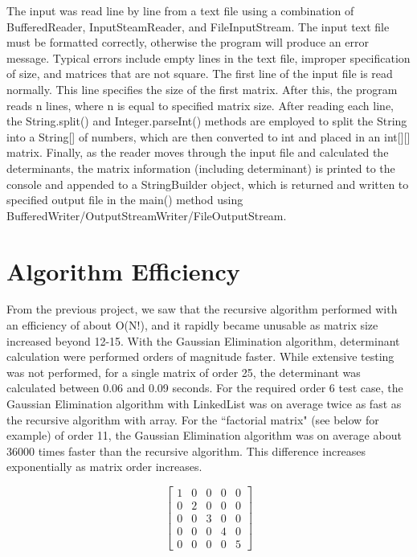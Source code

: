 \documentclass[12pt, titlepage]{article}
\begin{document}
The input was read line by line from a text file using a combination of BufferedReader, InputSteamReader, and FileInputStream. The input text file must be formatted correctly, otherwise the program will produce an error message. Typical errors include empty lines in the text file, improper specification of size, and matrices that are not square. The first line of the input file is read normally. This line specifies the size of the first matrix. After this, the program reads n lines, where n is equal to specified matrix size. After reading each line, the String.split() and Integer.parseInt() methods are employed to split the String into a String[] of numbers, which are then converted to int and placed in an int[][] matrix. Finally, as the reader moves through the input file and calculated the determinants, the matrix information (including determinant) is printed to the console and appended to a StringBuilder object, which is returned and written to specified output file in the main() method using BufferedWriter/OutputStreamWriter/FileOutputStream.





\section{Algorithm Efficiency}

From the previous project, we saw that the recursive algorithm performed with an efficiency of about O(N!), and it rapidly became unusable as matrix size increased beyond 12-15. With the Gaussian Elimination algorithm, determinant calculation were performed orders of magnitude faster. While extensive testing was not performed, for a single matrix of order 25, the determinant was calculated between 0.06 and 0.09 seconds. For the required order 6 test case, the Gaussian Elimination algorithm with LinkedList was on average twice as fast as the recursive algorithm with array. For the ``factorial matrix" (see below for example) of order 11, the Gaussian Elimination algorithm was on average about 36000 times faster than the recursive algorithm. This difference increases exponentially as matrix order increases.

\[
\begin{bmatrix}
	1 & 0 & 0 & 0 & 0 \\
	0 & 2 & 0 & 0 & 0 \\
	0 & 0 & 3 & 0 & 0 \\
	0 & 0 & 0 & 4 & 0 \\
	0 & 0 & 0 & 0 & 5 
\end{bmatrix}
\]
\end{document}
